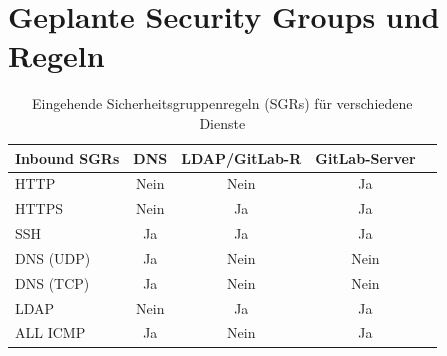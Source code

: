 \documentclass[a4paper,12pt]{article}
\begin{document}
\newpage

\section{Geplante Security Groups und Regeln}

\begin{table}[h!]
	\centering
	\begin{tabular}{|l|c|c|c|c|}
		\hline
		\textbf{Inbound SGRs} & \textbf{DNS} & \textbf{LDAP/GitLab-R} & \textbf{GitLab-Server} \\ \hline
		HTTP                  & Nein             & Nein                   & Ja                     \\ \hline
		HTTPS                 & Nein             & Ja                     & Ja                     \\ \hline
		SSH                   & Ja               & Ja                     & Ja                     \\ \hline
		DNS (UDP)             & Ja             & Nein                   & Nein                   \\ \hline
		DNS (TCP)             & Ja             & Nein                   & Nein                   \\ \hline
		LDAP                  & Nein             & Ja                     & Ja                     \\ \hline
		ALL ICMP              & Ja             & Nein                   & Ja                     \\ \hline
	\end{tabular}
	\caption{Eingehende Sicherheitsgruppenregeln (SGRs) für verschiedene Dienste}
	\label{tab:inbound-sgrs}
\end{table}
\end{document}
